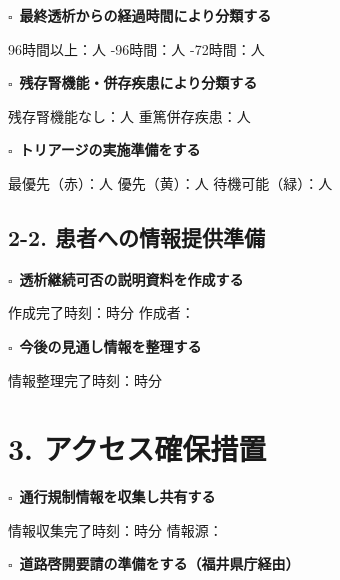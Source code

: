 \documentclass[a4paper,12pt]{jarticle}
\newcommand{\checkbox}{$\square$\ }
\newcommand{\underlinespace}[1]{\underline{\hspace{#1}}}
\begin{document}
\vspace{3mm}

\checkbox \textbf{最終透析からの経過時間により分類する}

\quad 96時間以上：\underlinespace{2cm}人 -96時間：\underlinespace{2cm}人 -72時間：\underlinespace{2cm}人

\vspace{3mm}

\checkbox \textbf{残存腎機能・併存疾患により分類する}

\quad 残存腎機能なし：\underlinespace{2cm}人 \quad 重篤併存疾患：\underlinespace{2cm}人

\vspace{3mm}

\checkbox \textbf{トリアージの実施準備をする}

\quad 最優先（赤）：\underlinespace{2cm}人 \quad 優先（黄）：\underlinespace{2cm}人 \quad 待機可能（緑）：\underlinespace{2cm}人

\vspace{5mm}

\subsection*{2-2. 患者への情報提供準備}

\checkbox \textbf{透析継続可否の説明資料を作成する}

\quad 作成完了時刻：\underlinespace{1cm}時\underlinespace{1cm}分 \quad 作成者：\underlinespace{4cm}

\vspace{3mm}

\checkbox \textbf{今後の見通し情報を整理する}

\quad 情報整理完了時刻：\underlinespace{1cm}時\underlinespace{1cm}分

\vspace{5mm}

\section*{3. アクセス確保措置}

\checkbox \textbf{通行規制情報を収集し共有する}

\quad 情報収集完了時刻：\underlinespace{1cm}時\underlinespace{1cm}分 \quad 情報源：\underlinespace{6cm}

\vspace{3mm}

\checkbox \textbf{道路啓開要請の準備をする（福井県庁経由）}
\end{document}
